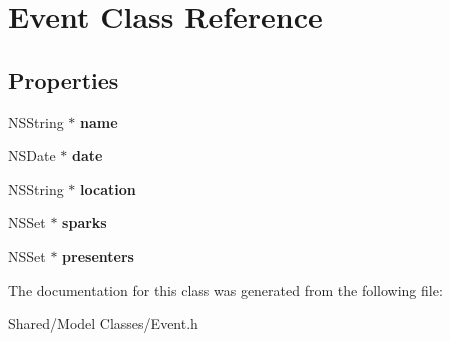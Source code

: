 \hypertarget{interface_event}{
\section{Event Class Reference}
\label{interface_event}
}
\subsection*{Properties}
\begin{DoxyCompactItemize}
\item 
\hypertarget{interface_event_a45982244ae883d190a11a8d6456f16ee}{
NSString $\ast$ {\bfseries name}}
\label{interface_event_a45982244ae883d190a11a8d6456f16ee}

\item 
\hypertarget{interface_event_a96b924077f783ea90792023475507cb7}{
NSDate $\ast$ {\bfseries date}}
\label{interface_event_a96b924077f783ea90792023475507cb7}

\item 
\hypertarget{interface_event_a36a3ee76774c754c535ec29a7529c1fe}{
NSString $\ast$ {\bfseries location}}
\label{interface_event_a36a3ee76774c754c535ec29a7529c1fe}

\item 
\hypertarget{interface_event_acd8011155ee058bad125bb1a7538dec5}{
NSSet $\ast$ {\bfseries sparks}}
\label{interface_event_acd8011155ee058bad125bb1a7538dec5}

\item 
\hypertarget{interface_event_ab33d8be6f28a66623fb82d3fd30e580d}{
NSSet $\ast$ {\bfseries presenters}}
\label{interface_event_ab33d8be6f28a66623fb82d3fd30e580d}

\end{DoxyCompactItemize}


The documentation for this class was generated from the following file:\begin{DoxyCompactItemize}
\item 
Shared/Model Classes/Event.h\end{DoxyCompactItemize}
